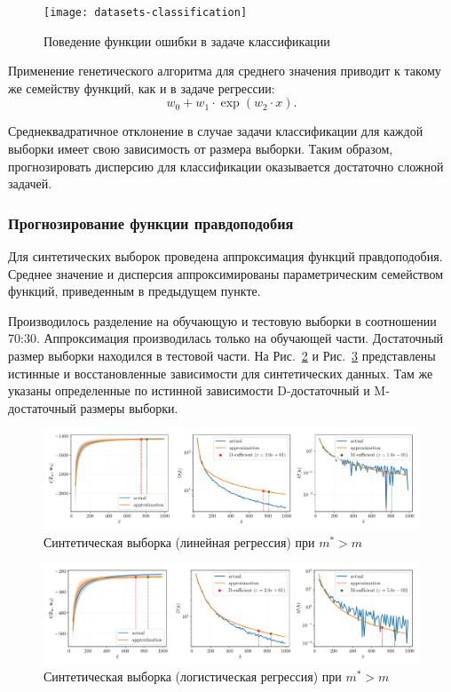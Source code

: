 \begin{figure}[h!]
    \centering
    \texttt{[image: datasets-classification]}
    \caption{Поведение функции ошибки в задаче классификации}
    \label{datasets-classification}
\end{figure}

Применение генетического алгоритма для среднего значения приводит к такому же семейству функций, как и в задаче регрессии:
\[ w_0 + w_1 \cdot \exp(w_2 \cdot x). \]

Среднеквадратичное отклонение в случае задачи классификации для каждой выборки имеет свою зависимость от размера выборки. Таким образом, прогнозировать дисперсию для классификации оказывается достаточно сложной задачей.

\subsubsection{Прогнозирование функции правдоподобия}

Для синтетических выборок проведена аппроксимация функций правдоподобия. Среднее значение и дисперсия аппроксимированы параметрическим семейством функций, приведенным в предыдущем пункте.

Производилось разделение на обучающую и тестовую выборки в соотношении 70:30. Аппроксимация производилась только на обучающей части. Достаточный размер выборки находился в тестовой части. На Рис.~\ref{synthetic-regression-approximation} и Рис.~\ref{synthetic-classification-approximation} представлены истинные и восстановленные зависимости для синтетических данных. Там же указаны определенные по истинной зависимости D-достаточный и M-достаточный размеры выборки. 

\begin{figure}[h!]
    \centering
    \includegraphics[width=\textwidth]{synthetic-regression-approximation}
    \caption{Синтетическая выборка (линейная регрессия) при $m^* > m$}
    \label{synthetic-regression-approximation}
\end{figure}

\begin{figure}[h!]
    \centering
    \includegraphics[width=\textwidth]{synthetic-classification-approximation}
    \caption{Синтетическая выборка (логистическая регрессия) при $m^* > m$}
    \label{synthetic-classification-approximation}
\end{figure}

